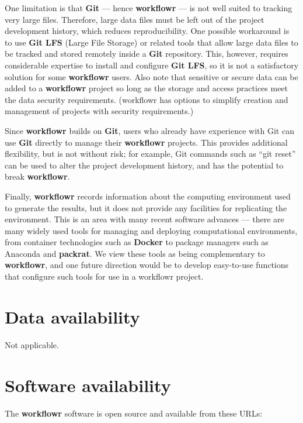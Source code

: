 \documentclass[9pt,a4paper]{extarticle}
\begin{document}
One limitation is that \textbf{Git} --- hence \textbf{workflowr} --- is not well suited to
tracking very large files. Therefore, large data files must be left out
of the project development history, which reduces reproducibility. One
possible workaround is to use \textbf{Git LFS} (Large File Storage) or related
tools that allow large data files to be tracked and stored remotely
inside a \textbf{Git} repository. This, however, requires considerable expertise
to install and configure \textbf{Git LFS}, so it is not a satisfactory solution
for some \textbf{workflowr} users. Also note that sensitive or secure data can be
added to a \textbf{workflowr} project so long as the storage and access practices
meet the data security requirements. (workflowr has options to simplify
creation and management of projects with security requirements.)

Since \textbf{workflowr} builds on \textbf{Git}, users who already have experience with
Git can use \textbf{Git} directly to manage their \textbf{workflowr} projects. This
provides additional flexibility, but is not without risk; for example,
Git commands such as “git reset” can be used to alter the project
development history, and has the potential to break \textbf{workflowr}.

Finally, \textbf{workflowr} records information about the computing environment
used to generate the results, but it does not provide any facilities for
replicating the environment. This is an area with many recent software
advances --- there are many widely used tools for managing and deploying
computational environments, from container technologies such as \textbf{Docker}
to package managers such as Anaconda and \textbf{packrat}. We view these tools as
being complementary to \textbf{workflowr}, and one future direction would be to
develop easy-to-use functions that configure such tools for use in a
workflowr project.


\section*{Data availability}

Not applicable.


\section*{Software availability}

The \textbf{workflowr} software is open source and available from these URLs:
\end{document}
